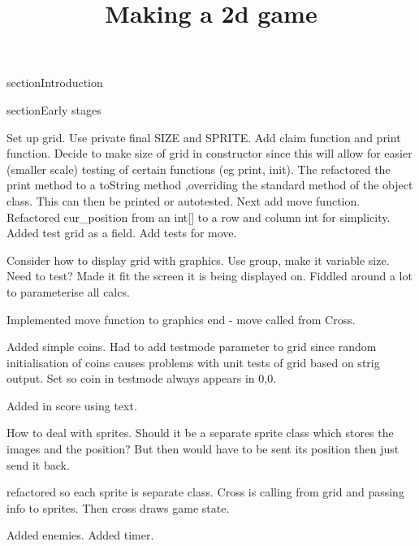 \documentclass{article}
\begin{document}
\title{Making a 2d game}
\maketitle

section{Introduction}

section{Early stages}

Set up grid. Use private final SIZE and SPRITE. Add claim function and print function. Decide to make size of grid
in constructor since this will allow for easier (smaller scale) testing of certain functions (eg print, init).
The refactored the print method to a toString method ,overriding the standard method of the object class. This
can then be printed or autotested. Next add move function. Refactored cur_position from an int[] to a row and
column int for simplicity. Added test grid as a field. Add tests for move.

Consider how to display grid with graphics. Use group, make it variable size. Need to test? Made it fit the screen
it is being displayed on. Fiddled around a lot to parameterise all calcs.

Implemented move function to graphics end - move called from Cross.

Added simple coins. Had to add testmode parameter to grid since random initialisation of coins causes problems with
unit tests of grid based on strig output. Set so coin in testmode always appears in 0,0.

Added in score using text.

How to deal with sprites. Should it be a separate sprite class which stores the images and the position? But then
would have to be sent its position then just send it back.

refactored so each sprite is separate class. Cross is calling from grid and passing info to sprites. Then cross draws
game state.

Added enemies. Added timer.
\end{document}
